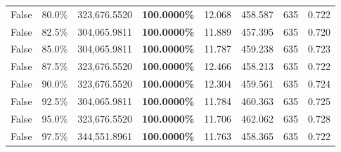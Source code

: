 \begin{table}[H]
\begin{tabular}{lllrllll}
\cline{1-8}
False & 80.0\% & 323,676.5520 & \bfseries \color{red} 100.0000\% & 12.068 & 458.587 & 635 & 0.722 \\
\cline{1-8}
False & 82.5\% & 304,065.9811 & \bfseries \color{red} 100.0000\% & 11.889 & 457.395 & 635 & 0.720 \\
\cline{1-8}
False & 85.0\% & 304,065.9811 & \bfseries \color{red} 100.0000\% & 11.787 & 459.238 & 635 & 0.723 \\
\cline{1-8}
False & 87.5\% & 323,676.5520 & \bfseries \color{red} 100.0000\% & 12.466 & 458.213 & 635 & 0.722 \\
\cline{1-8}
False & 90.0\% & 323,676.5520 & \bfseries \color{red} 100.0000\% & 12.304 & 459.561 & 635 & 0.724 \\
\cline{1-8}
False & 92.5\% & 304,065.9811 & \bfseries \color{red} 100.0000\% & 11.784 & 460.363 & 635 & 0.725 \\
\cline{1-8}
False & 95.0\% & 323,676.5520 & \bfseries \color{red} 100.0000\% & 11.706 & 462.062 & 635 & 0.728 \\
\cline{1-8}
False & 97.5\% & 344,551.8961 & \bfseries \color{red} 100.0000\% & 11.763 & 458.365 & 635 & 0.722 \\
\cline{1-8}
\bottomrule
\end{tabular}
\end{table}
